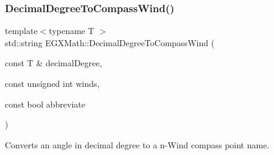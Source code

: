 \subsubsection{\texorpdfstring{Decimal\+Degree\+To\+Compass\+Wind()}{DecimalDegreeToCompassWind()}}
{\footnotesize\ttfamily template$<$typename T $>$ \\
std\+::string E\+G\+X\+Math\+::\+Decimal\+Degree\+To\+Compass\+Wind (\begin{DoxyParamCaption}\item[{const T \&}]{decimal\+Degree,  }\item[{const unsigned int}]{winds,  }\item[{const bool}]{abbreviate }\end{DoxyParamCaption})}



Converts an angle in decimal degree to a n-\/\+Wind compass point name. 

